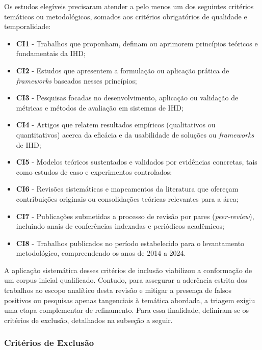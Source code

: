 \documentclass[
	12pt,				%
	oneside,			%
	a4paper,			%
	english,			%
	brazil				%
	]{abntex2ppgsi}
\begin{document}
    Os estudos elegíveis precisaram atender a pelo menos um dos seguintes critérios temáticos ou metodológicos, somados aos critérios obrigatórios de qualidade e temporalidade:

\begin{itemize}
\item[] \textbf{CI1} - Trabalhos que proponham, definam ou aprimorem princípios teóricos e fundamentais da IHD;
\item[] \textbf{CI2} - Estudos que apresentem a formulação ou aplicação prática de \textit{frameworks} baseados nesses princípios;
\item[] \textbf{CI3} - Pesquisas focadas no desenvolvimento, aplicação ou validação de métricas e métodos de avaliação em sistemas de IHD;
\item[] \textbf{CI4} - Artigos que relatem resultados empíricos (qualitativos ou quantitativos) acerca da eficácia e da usabilidade de soluções ou \textit{frameworks} de IHD;
\item[] \textbf{CI5} - Modelos teóricos sustentados e validados por evidências concretas, tais como estudos de caso e experimentos controlados;
\item[] \textbf{CI6} - Revisões sistemáticas e mapeamentos da literatura que ofereçam contribuições originais ou consolidações teóricas relevantes para a área;
\item[] \textbf{CI7} - Publicações submetidas a processo de revisão por pares (\textit{peer-review}), incluindo anais de conferências indexadas e periódicos acadêmicos;
\item[] \textbf{CI8} - Trabalhos publicados no período estabelecido para o levantamento metodológico, compreendendo os anos de 2014 a 2024.
\end{itemize}

    A aplicação sistemática desses critérios de inclusão viabilizou a conformação de um corpus inicial qualificado. Contudo, para assegurar a aderência estrita dos trabalhos ao escopo analítico desta revisão e mitigar a presença de falsos positivos ou pesquisas apenas tangenciais à temática abordada, a triagem exigiu uma etapa complementar de refinamento. Para essa finalidade, definiram-se os critérios de exclusão, detalhados na subseção a seguir.
    
\subsubsection{Critérios de Exclusão}
\label{crit:exclu}
\end{document}
